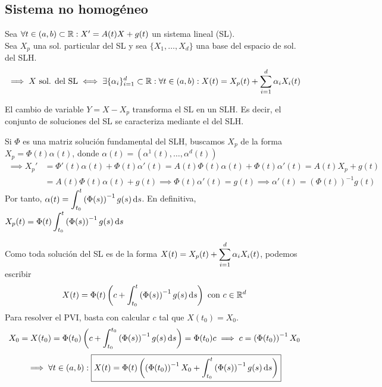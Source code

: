 \subsection{Sistema no homogéneo}

\begin{prop}
	Sea $\forall t \in (a,b) \subset \mathbb{R} : X'=A(t)X + g(t)$ un sistema lineal (SL).\\
	Sea $X_p$ una sol. particular del SL y sea $\{X_1, \dots, X_d\}$ una base del espacio de sol. del SLH.
	\[\implies X \text{ sol. del SL} \iff \exists \{\alpha_i\}_{i=1}^d \subset \mathbb{R} :\forall t \in (a, b) : X(t) = X_p(t) + \sum_{i=1}^{d} \alpha_i X_i(t)\]
	\begin{dem} %
		El cambio de variable $Y = X - X_p$ transforma el SL en un SLH. Es decir, el conjunto de soluciones del SL se caracteriza mediante el del SLH.
	\end{dem}
\end{prop}


Si $\Phi$ es una matriz solución fundamental del SLH, buscamos $X_p$ de la forma $X_p = \Phi(t) \alpha(t)$, donde $\alpha(t) = \left(\alpha^1(t), \dots, \alpha^d(t)\right)$
\[\begin{aligned}
		\implies X_p' & = \Phi'(t) \alpha(t) + \Phi(t) \alpha'(t) = A(t) \Phi(t) \alpha(t) + \Phi(t) \alpha'(t) = A(t) X_p + g(t)              \\
		              & = A(t) \Phi(t) \alpha(t) + g(t) \implies \Phi(t)\alpha'(t) = g(t) \implies \alpha'(t) = \left(\Phi(t)\right)^{-1} g(t)
	\end{aligned}\]
Por tanto, $\ds \alpha(t) = \int_{t_0}^{t} \left(\Phi(s)\right)^{-1} g(s) \odif{s}$. En definitiva, $\ds X_p(t) = \Phi(t) \int_{t_0}^{t} \left(\Phi(s)\right)^{-1} g(s) \odif{s}$

Como toda solución del SL es de la forma $\displaystyle X(t) = X_p(t) + \sum_{i=1}^{d} \alpha_i X_i(t)$, podemos escribir
\[X(t) = \Phi(t) \left(c + \int_{t_0}^{t} \left(\Phi(s)\right)^{-1} g(s) \odif{s}\right) \tex{ con } c \in \R^d\]
Para resolver el PVI, basta con calcular $c$ tal que $X(t_0) = X_0$.
\[X_0 = X(t_0) = \Phi(t_0) \left(c + \int_{t_0}^{t_0} \left(\Phi(s)\right)^{-1} g(s) \odif{s}\right) = \Phi(t_0) c \implies c = \left(\Phi(t_0)\right)^{-1} X_0\]
\[\implies \forall t \in (a, b) : \boxed{X(t) = \Phi(t) \left(\left(\Phi(t_0)\right)^{-1} X_0 + \int_{t_0}^{t} \left(\Phi(s)\right)^{-1} g(s) \odif{s}\right)}\]

